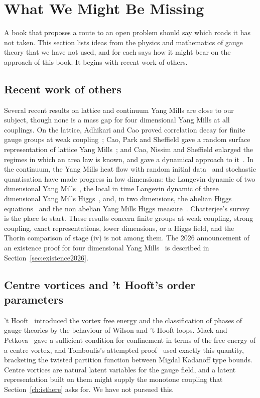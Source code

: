 \section{What We Might Be Missing}\label{ch:missing}

A book that proposes a route to an open problem should say which roads it has not taken. This section lists ideas from the physics and mathematics of gauge theory that we have not used, and for each says how it might bear on the approach of this book. It begins with recent work of others.

\subsection{Recent work of others}

Several recent results on lattice and continuum Yang Mills are close to our subject, though none is a mass gap for four dimensional Yang Mills at all couplings. On the lattice, Adhikari and Cao proved correlation decay for finite gauge groups at weak coupling~\cite{AC}; Cao, Park and Sheffield gave a random surface representation of lattice Yang Mills~\cite{CPS25}; and Cao, Nissim and Sheffield enlarged the regimes in which an area law is known, and gave a dynamical approach to it~\cite{CNS25}. In the continuum, the Yang Mills heat flow with random initial data~\cite{CC23} and stochastic quantisation have made progress in low dimensions: the Langevin dynamic of two dimensional Yang Mills~\cite{CCHS,ChSh23,BC23}, the local in time Langevin dynamic of three dimensional Yang Mills Higgs~\cite{CCHS3}, and, in two dimensions, the abelian Higgs equations~\cite{BC24} and the non abelian Yang Mills Higgs measure~\cite{BCHZ}. Chatterjee's survey~\cite{Ch19} is the place to start. These results concern finite groups at weak coupling, strong coupling, exact representations, lower dimensions, or a Higgs field, and the Thorin comparison of stage (iv) is not among them. The 2026 announcement of an existence proof for four dimensional Yang Mills~\cite{OAI,Woit26} is described in Section~\ref{sec:existence2026}.

\subsection{Centre vortices and 't Hooft's order parameters}

't Hooft~\cite{tH78} introduced the vortex free energy and the classification of phases of gauge theories by the behaviour of Wilson and 't Hooft loops. Mack and Petkova~\cite{MP80} gave a sufficient condition for confinement in terms of the free energy of a centre vortex, and Tomboulis's attempted proof~\cite{To07} used exactly this quantity, bracketing the twisted partition function between Migdal Kadanoff type bounds. Centre vortices are natural latent variables for the gauge field, and a latent representation built on them might supply the monotone coupling that Section~\ref{ch:isthere} asks for. We have not pursued this.

